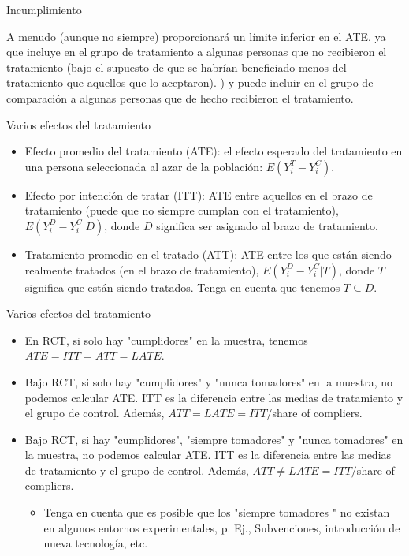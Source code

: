 \documentclass[11pt, aspectratio=169, compress]{beamer}
\begin{document}
\begin{frame}{Incumplimiento}
  
  A menudo (aunque no siempre) proporcionará un límite inferior en el ATE, ya que incluye en el grupo de tratamiento a algunas personas que no recibieron el tratamiento (bajo el supuesto de que se habrían beneficiado menos del tratamiento que aquellos que lo aceptaron). ) y puede incluir en el grupo de comparación a algunas personas que de hecho recibieron el tratamiento.
  
\end{frame}
\begin{frame}{Varios efectos del tratamiento}
	\begin{itemize}
		\item Efecto promedio del tratamiento (ATE): el efecto esperado del tratamiento en una persona seleccionada al azar de la población: $E(Y_{i}^{T}-Y_{i}^{C})$. 
		\item Efecto por intención de tratar (ITT): ATE entre aquellos en el brazo de tratamiento (puede que no siempre cumplan con el tratamiento), $E(Y_{i}^{D} - Y_{i}^{C}| D)$, donde $D$ significa ser asignado al brazo de tratamiento.
		\item Tratamiento promedio en el tratado (ATT): ATE entre los que están siendo realmente tratados (en el brazo de tratamiento), $E(Y_{i}^{D} - Y_{i}^{C}| T)$, donde $T$ significa que están siendo tratados. Tenga en cuenta que tenemos $ T \subseteq D$.
	\end{itemize}
\end{frame}
\begin{frame}{Varios efectos del tratamiento}
	\begin{itemize}
		\item En RCT, si solo hay "cumplidores" en la muestra, tenemos $ATE = ITT = ATT = LATE$. 
		\item Bajo RCT, si solo hay "cumplidores" y "nunca tomadores" en la muestra, no podemos calcular ATE. ITT es la diferencia entre las medias de tratamiento y el grupo de control. Además, $ ATT = LATE = ITT/$share of compliers.
		\item Bajo RCT, si hay "cumplidores", "siempre tomadores" y "nunca tomadores" en la muestra, no podemos calcular ATE. ITT es la diferencia entre las medias de tratamiento y el grupo de control. Además, $ ATT \neq LATE = ITT/$share of compliers.
		\begin{itemize}
			\item Tenga en cuenta que es posible que los "siempre tomadores " no existan en algunos entornos experimentales, p. Ej., Subvenciones, introducción de nueva tecnología, etc.
		\end{itemize}
	\end{itemize}
\end{frame}
\end{document}

